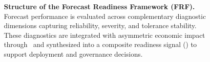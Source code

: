 \begin{figure}[t]
{%
}
\caption{\textbf{Structure of the Forecast Readiness Framework (FRF).}
Forecast performance is evaluated across complementary diagnostic dimensions capturing reliability, severity,
and tolerance stability. These diagnostics are integrated with asymmetric economic impact through \CWSL\ and
synthesized into a composite readiness signal (\FRS) to support deployment and governance decisions.}
\label{fig:frf_overview}
\end{figure}
